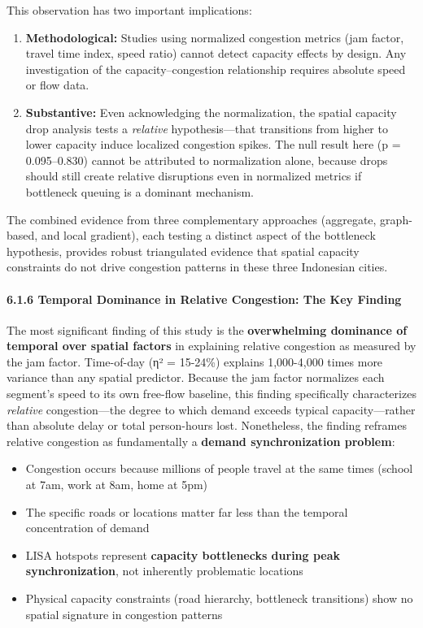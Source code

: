 \documentclass[
  12pt,
]{article}
\providecommand{\tightlist}{%
  \setlength{\itemsep}{0pt}\setlength{\parskip}{0pt}}
\begin{document}
This observation has two important implications:

\begin{enumerate}
\def\labelenumi{\arabic{enumi}.}
\item
  \textbf{Methodological:} Studies using normalized congestion metrics (jam factor, travel time index, speed ratio) cannot detect capacity effects by design. Any investigation of the capacity--congestion relationship requires absolute speed or flow data.
\item
  \textbf{Substantive:} Even acknowledging the normalization, the spatial capacity drop analysis tests a \emph{relative} hypothesis---that transitions from higher to lower capacity induce localized congestion spikes. The null result here (p = 0.095--0.830) cannot be attributed to normalization alone, because drops should still create relative disruptions even in normalized metrics if bottleneck queuing is a dominant mechanism.
\end{enumerate}

The combined evidence from three complementary approaches (aggregate, graph-based, and local gradient), each testing a distinct aspect of the bottleneck hypothesis, provides robust triangulated evidence that spatial capacity constraints do not drive congestion patterns in these three Indonesian cities.

\paragraph{6.1.6 Temporal Dominance in Relative Congestion: The Key Finding}\label{temporal-dominance-in-relative-congestion-the-key-finding}

The most significant finding of this study is the \textbf{overwhelming dominance of temporal over spatial factors} in explaining relative congestion as measured by the jam factor. Time-of-day (η² = 15-24\%) explains 1,000-4,000 times more variance than any spatial predictor. Because the jam factor normalizes each segment's speed to its own free-flow baseline, this finding specifically characterizes \emph{relative} congestion---the degree to which demand exceeds typical capacity---rather than absolute delay or total person-hours lost. Nonetheless, the finding reframes relative congestion as fundamentally a \textbf{demand synchronization problem}:

\begin{itemize}
\tightlist
\item
  Congestion occurs because millions of people travel at the same times (school at 7am, work at 8am, home at 5pm)
\item
  The specific roads or locations matter far less than the temporal concentration of demand
\item
  LISA hotspots represent \textbf{capacity bottlenecks during peak synchronization}, not inherently problematic locations
\item
  Physical capacity constraints (road hierarchy, bottleneck transitions) show no spatial signature in congestion patterns
\end{itemize}
\end{document}
